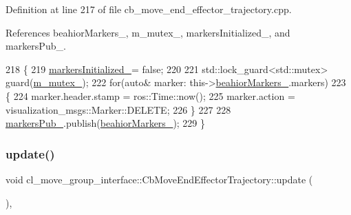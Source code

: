 Definition at line 217 of file cb\+\_\+move\+\_\+end\+\_\+effector\+\_\+trajectory.\+cpp.



References beahior\+Markers\+\_\+, m\+\_\+mutex\+\_\+, markers\+Initialized\+\_\+, and markers\+Pub\+\_\+.


\begin{DoxyCode}
218     \{
219         \hyperlink{classcl__move__group__interface_1_1CbMoveEndEffectorTrajectory_ac140a7f0adfb20f1e2900a5c8cd2ca5b}{markersInitialized\_}= \textcolor{keyword}{false};
220 
221         std::lock\_guard<std::mutex> guard(\hyperlink{classcl__move__group__interface_1_1CbMoveEndEffectorTrajectory_a2a98ef725cb3fc7f61654d3d6a2066bb}{m\_mutex\_});
222         \textcolor{keywordflow}{for}(\textcolor{keyword}{auto}& marker: this->\hyperlink{classcl__move__group__interface_1_1CbMoveEndEffectorTrajectory_a809fb5385adf27c0a1c8f8136566949c}{beahiorMarkers\_}.markers)
223         \{
224             marker.header.stamp = ros::Time::now();
225             marker.action = visualization\_msgs::Marker::DELETE;
226         \}
227 
228         \hyperlink{classcl__move__group__interface_1_1CbMoveEndEffectorTrajectory_aabc2216b2d8625fecd83c5ec69928e63}{markersPub\_}.publish(\hyperlink{classcl__move__group__interface_1_1CbMoveEndEffectorTrajectory_a809fb5385adf27c0a1c8f8136566949c}{beahiorMarkers\_});
229     \}
\end{DoxyCode}
\mbox{\label{classcl__move__group__interface_1_1CbMoveEndEffectorTrajectory_a57fedb6a0603fe569842a13faf19f5cd}} 
\subsubsection{\texorpdfstring{update()}{update()}}
{\footnotesize\ttfamily void cl\+\_\+move\+\_\+group\+\_\+interface\+::\+Cb\+Move\+End\+Effector\+Trajectory\+::update (\begin{DoxyParamCaption}{ }\end{DoxyParamCaption})\hspace{0.3cm}{\ttfamily [override]}, {\ttfamily [virtual]}}



